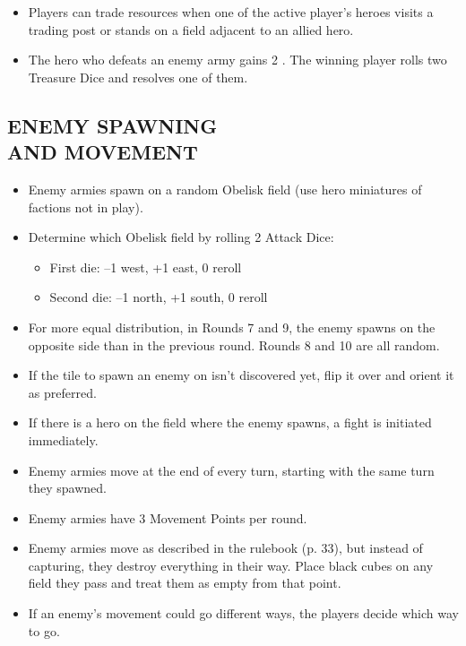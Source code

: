 \begin{multicols*}{2}
\begin{itemize}
  \item Players can trade resources when one of the active player's heroes visits a trading post or stands on a field adjacent to an allied hero.
  \item The hero who defeats an enemy army gains 2 .
    The winning player rolls two Treasure Dice and resolves one of them.
\end{itemize}

\columnbreak

\subsection*{\MakeUppercase{Enemy Spawning\\and Movement}}

\begin{itemize}
  \item Enemy armies spawn on a random Obelisk field (use hero miniatures of factions not in play).
  \item Determine which Obelisk field by rolling 2 Attack Dice:
  \begin{itemize}
    \item First die: --1 west, +1 east, 0 reroll
    \item Second die: --1 north, +1 south, 0 reroll
  \end{itemize}
  \item For more equal distribution, in Rounds 7 and 9, the enemy spawns on the opposite side than in the previous round.
    Rounds 8 and 10 are all random.
  \item If the tile to spawn an enemy on isn't discovered yet, flip it over and orient it as preferred.
  \item If there is a hero on the field where the enemy spawns, a fight is initiated immediately.
  \item Enemy armies move at the end of every turn, starting with the same turn they spawned.
  \item Enemy armies have 3 Movement Points per round.
  \item Enemy armies move as described in the rulebook (p. 33), but instead of capturing, they destroy everything in their way.
    Place black cubes on any field they pass and treat them as empty from that point.
  \item If an enemy's movement could go different ways, the players decide which way to go.
\end{itemize}



\end{multicols*}
